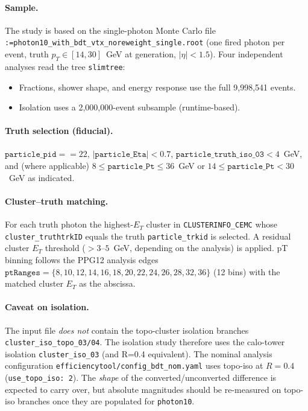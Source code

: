 \documentclass[11pt,a4paper]{article}
\makeatletter
\providecommand{\seqsplit}[1]{\@tfor\@tempc:=#1\do{\@tempc\allowbreak}}
\makeatother
\begin{document}
\paragraph{Sample.} The study is based on the single-photon Monte Carlo file
\texttt{\seqsplit{photon10\_with\_bdt\_vtx\_noreweight\_single.root}} (one
fired photon per event, truth $p_T \in [14,30]$~GeV at generation,
$|\eta|<1.5$).
Four independent analyses read the tree \texttt{slimtree}:
\begin{itemize}
  \item Fractions, shower shape, and energy response use the full 9{,}998{,}541
    events.
  \item Isolation uses a 2{,}000{,}000-event subsample (runtime-based).
\end{itemize}

\paragraph{Truth selection (fiducial).} $\texttt{particle\_pid} == 22$,
$|\texttt{particle\_Eta}| < 0.7$, $\texttt{particle\_truth\_iso\_03} < 4$~GeV,
and (where applicable) $8 \le \texttt{particle\_Pt} \le 36$~GeV or
$14 \le \texttt{particle\_Pt} < 30$~GeV as indicated.

\paragraph{Cluster--truth matching.} For each truth photon the highest-$E_T$
cluster in \texttt{CLUSTERINFO\_CEMC} whose
\texttt{cluster\_truthtrkID} equals the truth \texttt{particle\_trkid} is
selected. A residual cluster $E_T$ threshold ($>3$--$5$~GeV, depending on the
analysis) is applied. pT binning follows the PPG12 analysis edges
\(\texttt{ptRanges}=\{8,10,12,14,16,18,20,22,24,26,28,32,36\}\) (12 bins) with
the matched cluster $E_T$ as the abscissa.

\paragraph{Caveat on isolation.} The input file \emph{does not} contain the
topo-cluster isolation branches
\texttt{cluster\_iso\_topo\_03/04}. The isolation study therefore uses the
calo-tower isolation \texttt{cluster\_iso\_03} (and R=0.4 equivalent). The
nominal analysis configuration \texttt{efficiencytool/config\_bdt\_nom.yaml}
uses topo-iso at $R=0.4$ (\texttt{use\_topo\_iso: 2}). The \emph{shape} of the
converted/unconverted difference is expected to carry over, but absolute
magnitudes should be re-measured on topo-iso branches once they are populated
for \texttt{photon10}.
\end{document}
